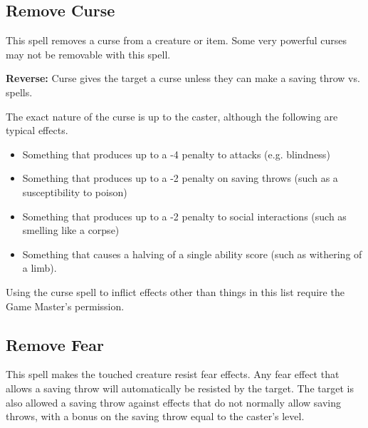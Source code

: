 \begin{multicols*}{2}
\subsection{Remove Curse}\label{spell:Remove Curse}

This spell removes a curse from a creature or item. Some very powerful curses may not be removable with this spell.

\textbf{Reverse:} \hypertarget{spell:Curse}{Curse} gives the target a curse unless they can make a saving throw vs. spells.

The exact nature of the curse is up to the caster, although the following are typical effects.

\begin{itemize}
	\item{Something that produces up to a -4 penalty to attacks (e.g. blindness)}
	\item{Something that produces up to a -2 penalty on saving throws (such as a susceptibility to poison)}
	\item{Something that produces up to a -2 penalty to social interactions (such as smelling like a corpse)}
	\item{Something that causes a halving of a single ability score (such as withering of a limb).}
\end{itemize}

Using the curse spell to inflict effects other than things in this list require the Game Master’s permission.

\subsection{Remove Fear}\label{spell:Remove Fear}

This spell makes the touched creature resist fear effects. Any fear effect that allows a saving throw will automatically be resisted by the target. The target is also allowed a saving throw against effects that do not normally allow saving throws, with a bonus on the saving throw equal to the caster’s level.


\end{multicols*}

